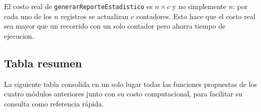 

El costo real de \texttt{generarReporteEstadistico} es $n \times c$ y no simplemente $n$: 
por cada uno de los $n$ registros se actualizan $c$ contadores.
Esto hace que el costo real sea mayor que un recorrido con un solo contador pero ahorra tiempo de ejecucion.

\subsection{Tabla resumen}

La siguiente tabla consolida en un solo lugar todas las funciones propuestas de los cuatro módulos
anteriores junto con su costo computacional, para facilitar su consulta como referencia rápida.


